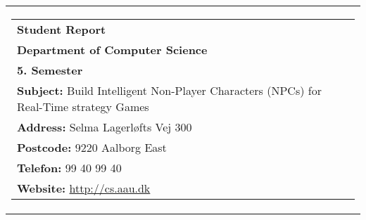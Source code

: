 
	\begin{tabular}{r}
		\parbox{\textwidth}{  
		 \hfill \parbox{4.9cm}{ %
			\begin{tabular}{l} 
				{\textsf{\small{\textbf{Student Report}}}}\\
				{\textsf{\small{\textbf{Department of Computer Science}}}}\\
				{\textsf{\small{\textbf{5. Semester}}}}\\
				{\textsf{\small{\textbf{Subject:} Build Intelligent Non-Player Characters (NPCs) for Real-Time strategy Games}}} \\
				{\textsf{\small{\textbf{Address:} Selma Lagerløfts Vej 300}}} \\
				{\textsf{\small{\textbf{Postcode:} 9220 Aalborg East}}} \\
				{\textsf{\small{\textbf{Telefon:} 99 40 99 40}}} \\
				{\textsf{\small{\textbf{Website:} \url{http://cs.aau.dk}}}}
			\end{tabular}}}
	\end{tabular}

